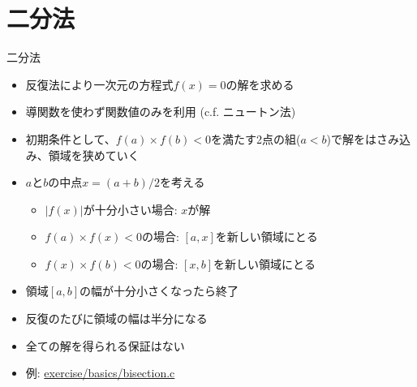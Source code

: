 \section{二分法}

\begin{frame}[t,fragile]{二分法}
  \begin{itemize}
  \item 反復法により一次元の方程式$f(x)=0$の解を求める
  \item 導関数を使わず関数値のみを利用 (c.f. ニュートン法)
  \item 初期条件として、$f(a) \times f(b) < 0$を満たす2点の組($a<b$)で解をはさみ込み、領域を狭めていく
  \item $a$と$b$の中点$x=(a+b)/2$を考える
    \begin{itemize}
    \item $|f(x)|$が十分小さい場合: $x$が解
    \item $f(a) \times f(x) < 0$の場合: $[a,x]$を新しい領域にとる
    \item $f(x) \times f(b) < 0$の場合: $[x,b]$を新しい領域にとる
    \end{itemize}
  \item 領域$[a,b]$の幅が十分小さくなったら終了
  \item 反復のたびに領域の幅は半分になる
  \item 全ての解を得られる保証はない
  \item 例: \href{https://github.com/todo-group/computer-experiments/blob/master/exercise/basics/bisection.c}{exercise/basics/bisection.c}
  \end{itemize}
\end{frame}

